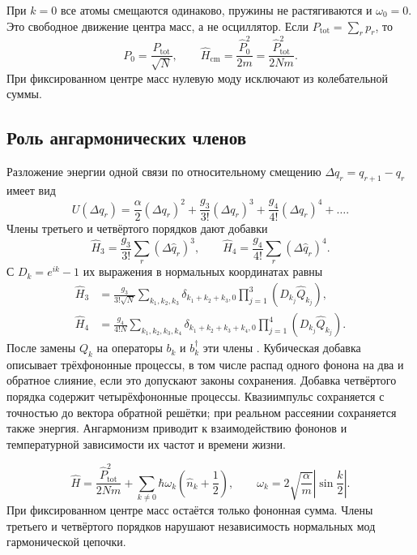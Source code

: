 \documentclass[../final.tex]{subfiles}
\begin{document}
При $k=0$ все атомы смещаются одинаково, пружины не растягиваются
и $\omega_0=0$. Это свободное движение центра масс, а не осциллятор.
Если $P_{\mathrm{tot}}=\sum_r p_r$, то
\[
    P_0=\frac{P_{\mathrm{tot}}}{\sqrt N},\qquad
    \hat H_{\mathrm{cm}}=\frac{\hat P_0^2}{2m}
       =\frac{\hat P_{\mathrm{tot}}^2}{2Nm}.
\]
При фиксированном центре масс нулевую моду исключают из
колебательной суммы.

\subsection*{Роль ангармонических членов}

Разложение энергии одной связи по относительному смещению
$\Delta q_r=q_{r+1}-q_r$ имеет вид
\[
    U(\Delta q_r)=\frac\alpha2(\Delta q_r)^2
       +\frac{g_3}{3!}(\Delta q_r)^3
       +\frac{g_4}{4!}(\Delta q_r)^4+\ldots.
\]
Члены третьего и четвёртого порядков дают добавки
\[
    \hat H_3=\frac{g_3}{3!}\sum_r(\Delta\hat q_r)^3,
    \qquad \hat H_4=\frac{g_4}{4!}\sum_r(\Delta\hat q_r)^4.
\]
С $D_k=e^{ik}-1$ их выражения в нормальных координатах равны
\begin{align*}
    \hat H_3&=\frac{g_3}{3!\sqrt N}
       \sum_{k_1,k_2,k_3}\delta_{k_1+k_2+k_3,0}
         \prod_{j=1}^3(D_{k_j}\hat Q_{k_j}),\\
    \hat H_4&=\frac{g_4}{4!N}
       \sum_{k_1,k_2,k_3,k_4}\delta_{k_1+k_2+k_3+k_4,0}
         \prod_{j=1}^4(D_{k_j}\hat Q_{k_j}).
\end{align*}
После замены $Q_k$ на операторы $b_k$ и $b_k^\dagger$ эти члены
.
Кубическая добавка описывает трёхфононные процессы, в том числе
распад одного фонона на два и обратное слияние, если это допускают
законы сохранения. Добавка четвёртого порядка содержит четырёхфононные
процессы. Квазиимпульс сохраняется с точностью до вектора обратной
решётки; при реальном рассеянии сохраняется также энергия.
Ангармонизм приводит к взаимодействию фононов и температурной
зависимости их частот и времени жизни.

\answer
\[
    \hat H=\frac{\hat P_{\mathrm{tot}}^2}{2Nm}
       +\sum_{k\ne0}\hbar\omega_k\left(\hat n_k+\frac12\right),
    \qquad \omega_k=2\sqrt{\frac\alpha m}\left|\sin\frac k2\right|.
\]
При фиксированном центре масс остаётся только фононная сумма.
Члены третьего и четвёртого порядков нарушают независимость нормальных мод
гармонической цепочки.

\endgroup
\end{document}
